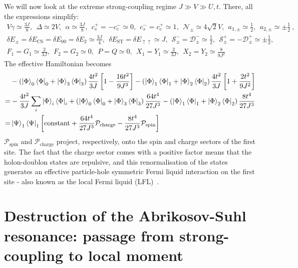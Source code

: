 \documentclass{report}
\numberwithin{equation}{section}
\begin{document}
We will now look at the extreme strong-coupling regime \(J \gg V \gg U,t\). There, all the expressions simplify:
\begin{gather}
	V\gamma \simeq \frac{3J}{8},~ ~ \Delta \simeq 2V,~ ~ \alpha \simeq \frac{3J}{8}, ~ ~ c_s^+ = -c_c^- \simeq 0, ~ ~ c_s^- = c_c^+ \simeq 1, ~ ~ \mathcal{N}_\pm \simeq 4\sqrt 2 V, ~ ~ a_{1,\pm} \simeq \frac{1}{2}, ~ ~ a_{2,\pm} \simeq \pm \frac{1}{2}~,\nonumber\\
	\delta E_\pm = \delta E_\mathrm{CS} = \delta E_{00} = \delta E_2 \simeq \frac{3J}{4}, ~ ~ \delta E_\mathrm{ST} = \delta E_{\uparrow \uparrow} \simeq J, ~ ~ \mathcal{S}^-_\pm = \mathcal{D}^-_\pm \simeq \frac{1}{2}, ~ ~ \mathcal{S}^+_\pm = -\mathcal{D}^+_\pm \simeq \pm \frac{1}{2},~\nonumber\\
	F_1 = G_1 \simeq \frac{2}{3J}, ~ ~ F_2 = G_2 \simeq 0, ~ ~ P = Q \simeq 0,~ ~ X_1 = Y_1 \simeq \frac{2}{3J}, ~ ~ X_2 = Y_2 \simeq \frac{8}{9J^2}
\end{gather}
The effective Hamiltonian becomes
\begin{equation}\begin{aligned}
	&-\left(\ket{\Phi}_0 \bra{\Phi}_0 + \ket{\Phi}_3 \bra{\Phi}_3\right) \frac{4t^2}{3J}\left[1 - \frac{16 t^2}{9 J^3}\right] - \left(\ket{\Phi}_1 \bra{\Phi}_1 + \ket{\Phi}_2 \bra{\Phi}_2\right) \frac{4t^2}{3J}\left[1 + \frac{2t^2}{9 J^2} \right]\\
	=&-\frac{4t^2}{3J}\sum_i \ket{\Phi}_i \bra{\Phi}_i +  \left(\ket{\Phi}_0 \bra{\Phi}_0 + \ket{\Phi}_3 \bra{\Phi}_3\right) \frac{64 t^4}{27 J^3} - \left(\ket{\Phi}_1 \bra{\Phi}_1 + \ket{\Phi}_2 \bra{\Phi}_2\right) \frac{8t^4}{27 J^3}\\
	=& \ket{\Psi}_1 \bra{\Psi}_1 \left[\text{constant} + \frac{64 t^4}{27 J^3} \mathcal{P}_\text{charge}  - \frac{8t^4}{27 J^3}\mathcal{P}_\text{spin}\right] 
\end{aligned}\end{equation}
\(\mathcal{P}_\text{spin}\) and \(\mathcal{P}_\text{charge}\) project, respectively,  onto the spin and charge sectors of the first site. The fact that the charge sector comes with a positive factor means that the holon-doublon states are repulsive, and this renormalisation of the states generates an effective particle-hole symmetric Fermi liquid interaction on the first site - also known as the local Fermi liquid (LFL)~\cite{nozieres1974fermi}.

\section{Destruction of the Abrikosov-Suhl resonance: passage from strong-coupling to local moment}
\end{document}
